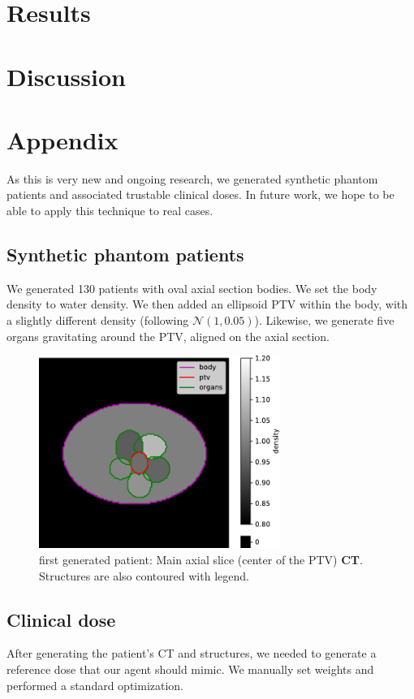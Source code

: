 \section{Results}



\section{Discussion}


\section*{Appendix}
As this is very new and ongoing research, we generated synthetic phantom patients and associated trustable clinical doses.
In future work, we hope to be able to apply this technique to real cases.

\subsection*{Synthetic phantom patients}
We generated 130 patients with oval axial section bodies.
We set the body density to water density.
We then added an ellipsoid PTV within the body, with a slightly different density (following $\mathcal{N}(1,0.05)$).
Likewise, we generate five organs gravitating around the PTV, aligned on the axial section.

\begin{figure}
	\centering
	\includegraphics[width=0.7\textwidth]{main_slice-ct.pdf}
	\caption{first generated patient: Main axial slice (center of the PTV) \textbf{CT}.\\ Structures are also contoured with legend.}
	\label{fig:main_slice-ct}
\end{figure}

\subsection*{Clinical dose}
After generating the patient's CT and structures, we needed to generate a reference dose that our agent should mimic.
We manually set weights and performed a standard optimization.

